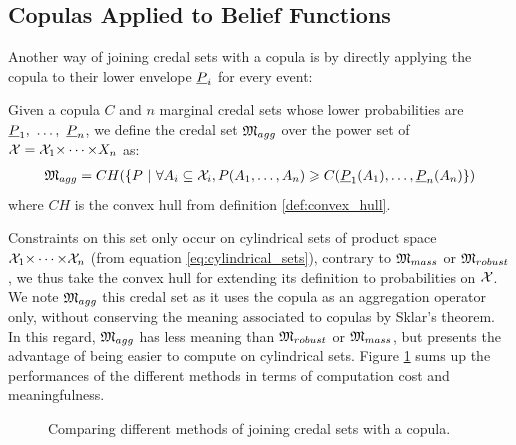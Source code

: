 \subsection{Copulas Applied to Belief Functions}\label{sec:aggregation_method}
Another way of joining credal sets with a copula is by directly applying the copula to their lower envelope ${\underline{P}}_i$ for every event:
\begin{definition}\label{def:aggregation_credal_set}
    Given a copula $C$ and $n$ marginal credal sets whose lower probabilities are ${\underline{P}}_1,~\dots,~{\underline{P}}_n$, we define the credal set ${\mathfrak{M}}_{agg}$ over the power set of ${\mathcal{X}}={\mathcal{X}}_1{\times\dots\times} X_n$ as:
    \begin{eqnarray}
        {\mathfrak{M}}_{agg} = CH(\{P ~|~\forall A_i\subseteq{\mathcal{X}}_i, P(A_1,\dots, A_n)\geqslant C({\underline{P}}_1(A_1), \dots, {\underline{P}}_n(A_n)\})\label{eq:copula_on_lower_proba}
    \end{eqnarray}
    where $CH$ is the convex hull from definition \ref{def:convex_hull}.
\end{definition}

Constraints on this set only occur on cylindrical sets of product space ${\mathcal{X}}_1{\times\dots\times} {\mathcal{X}}_n$ (from equation \ref{eq:cylindrical_sets}), contrary to ${\mathfrak{M}}_{mass}$ or ${\mathfrak{M}}_{robust}$, we thus take the convex hull for extending its definition to probabilities on ${\mathcal{X}}$. We note ${\mathfrak{M}}_{agg}$ this credal set as it uses the copula as an aggregation operator only, without conserving the meaning associated to copulas by Sklar's theorem. In this regard, ${\mathfrak{M}}_{agg}$ has less meaning than ${\mathfrak{M}}_{robust}$ or ${\mathfrak{M}}_{mass}$, but presents the advantage of being easier to compute on cylindrical sets. Figure \ref{fig:meaning_computation} sums up the performances of the different methods in terms of computation cost and meaningfulness.

\begin{figure}[!hb]
    \centering
    \caption{Comparing different methods of joining credal sets with a copula.}
    \label{fig:meaning_computation}
\end{figure}

